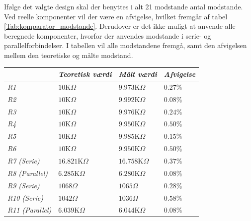 
Ifølge det valgte design skal der benyttes i alt 21 modstande antal modstande. Ved reelle komponenter vil der være en afvigelse, hvilket fremgår af tabel \ref{Tab:komparator_modstande}. Derudover er det ikke muligt at anvende alle beregnede komponenter, hvorfor der anvendes modstande i serie- og parallelforbindelser. I tabellen vil alle modstandene fremgå, samt den afvigelsen mellem den teoretiske og målte modstand. 
\begin{table}[H]
\centering
\begin{tabular}{|l|l|l|l|}
\hline
\textit{}               & \textit{Teoretisk værdi} & \textit{Målt værdi} & \textit{Afvigelse} \\ \hline
\textit{R1}             & $10$K$\Omega$            & $9.973$K$\Omega$    & $0.27\%$           \\ \hline
\textit{R2}             & $10$K$\Omega$            & $9.992$K$\Omega$    & $0.08\%$           \\ \hline
\textit{R3}             & $10$K$\Omega$            & $9.976$K$\Omega$    & $0.24\%$           \\ \hline
\textit{R4}             & $10$K$\Omega$            & $9.950$K$\Omega$    & $0.50\%$           \\ \hline
\textit{R5}             & $10$K$\Omega$            & $9.985$K$\Omega$    & $0.15\%$           \\ \hline
\textit{R6}             & $10$K$\Omega$            & $9.950$K$\Omega$    & $0.50\%$           \\ \hline
\textit{R7 (Serie)}     & $16.821$K$\Omega$        & $16.758$K$\Omega$   & $0.37\%$           \\ \hline
\textit{R8 (Parallel)}  & $6.285$K$\Omega$         & $6.280$K$\Omega$    & $0.08\%$           \\ \hline
\textit{R9 (Serie)}     & $1068\Omega$             & $1065\Omega$        & $0.28\%$           \\ \hline
\textit{R10 (Serie)}    & $1042\Omega$             & $1036\Omega$        & $0.58\%$           \\ \hline
\textit{R11 (Parallel)} & $6.039$K$\Omega$         & $6.044$K$\Omega$    & $0.08\%$           \\ \hline

\end{tabular}
\end{table}
